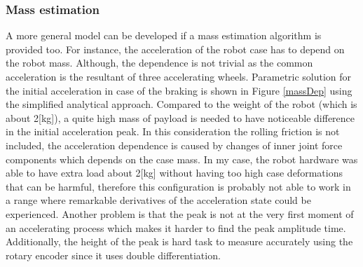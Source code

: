 \documentclass[12pt,english,twoside]{article}
\begin{document}
\subsubsection{Mass estimation}
A more general model can be developed if a mass estimation algorithm is provided too. For instance, the acceleration of the robot case has to depend on the robot mass. Although, the dependence is not trivial as the common acceleration is the resultant of three accelerating wheels. Parametric solution for the initial acceleration in case of the braking is shown in Figure \ref{massDep} using the simplified analytical approach. Compared to the weight of the robot (which is about 2[kg]), a quite high mass of payload is needed to have noticeable difference in the initial acceleration peak. In this consideration the rolling friction is not included, the acceleration dependence is caused by changes of inner joint force components which depends on the case mass. In my case, the robot hardware was able to have extra load about 2[kg] without having too high case deformations that can be harmful, therefore this configuration is probably not able to work in a range where remarkable derivatives of the acceleration state could be experienced. Another problem is that the peak is not at the very first moment of an accelerating process which makes it harder to find the peak amplitude time. Additionally, the height of the peak is hard task to measure accurately using the rotary encoder since it uses double differentiation.
\end{document}

